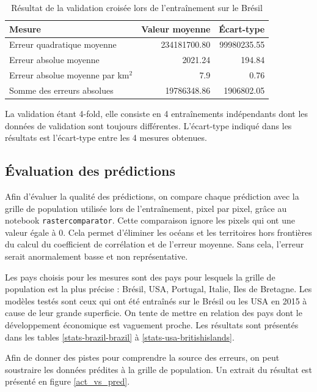 \documentclass[a4paper, 11pt]{report}
\begin{document}
\begin{table}[h]
\centering
\caption{Résultat de la validation croisée lors de l'entraînement sur le Brésil}
\begin{tabular}{ l r r }
	\hline
	\textbf{Mesure} & \textbf{Valeur moyenne} & \textbf{Écart-type} \\
	\hline\hline
	Erreur quadratique moyenne & 234181700.80 & 99980235.55 \\
	\hline
	Erreur absolue moyenne & 2021.24 & 194.84 \\
	\hline
	Erreur absolue moyenne par km$^2$ & 7.9 & 0.76 \\
	\hline
	Somme des erreurs absolues & 19786348.86 & 1906802.05 \\
	\hline
\end{tabular}
\label{k-fold}
\end{table}

La validation étant 4-fold, elle consiste en 4 entraînements indépendants dont les données de validation sont toujours différentes. L'écart-type indiqué dans les résultats est l'écart-type entre les 4 mesures obtenues.

\subsection{Évaluation des prédictions}
Afin d'évaluer la qualité des prédictions, on compare chaque prédiction avec la grille de population \cite{sedac} utilisée lors de l'entraînement, pixel par pixel, grâce au notebook \texttt{rastercomparator}. Cette comparaison ignore les pixels qui ont une valeur égale à 0. Cela permet d'éliminer les océans et les territoires hors frontières du calcul du coefficient de corrélation et de l'erreur moyenne. Sans cela, l'erreur serait anormalement basse et non représentative.

Les pays choisis pour les mesures sont des pays pour lesquels la grille de population \cite{sedac} est la plus précise : Brésil, USA, Portugal, Italie, Iles de Bretagne. Les modèles testés sont ceux qui ont été entraînés sur le Brésil ou les USA en 2015 à cause de leur grande superficie. On tente de mettre en relation des pays dont le développement économique est vaguement proche. Les résultats sont présentés dans les tables \ref{stats-brazil-brazil} à \ref{stats-usa-britishislands}.

Afin de donner des pistes pour comprendre la source des erreurs, on peut soustraire les données prédites à la grille de population. Un extrait du résultat est présenté en figure \ref{act_vs_pred}.
\end{document}
